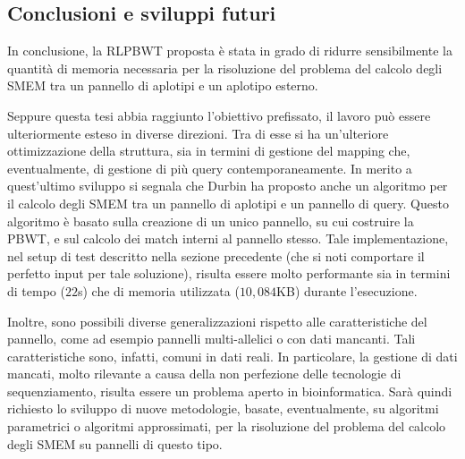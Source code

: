 \documentclass[a4paper,11pt, oneside,italian]{article}
\begin{document}
\subsection*{Conclusioni e sviluppi futuri}
In conclusione, la RLPBWT proposta è stata in grado di ridurre sensibilmente la
quantità di memoria necessaria per la risoluzione del 
problema del calcolo degli SMEM tra un pannello di aplotipi e un aplotipo
esterno.  

Seppure questa tesi abbia raggiunto l'obiettivo prefissato, il lavoro può essere
ulteriormente esteso in diverse direzioni. 
Tra di esse si ha
un'ulteriore ottimizzazione della struttura, sia in termini 
di gestione del mapping che, eventualmente, di gestione di più query
contemporaneamente. In merito a quest'ultimo sviluppo si segnala che Durbin
ha proposto anche un algoritmo per il calcolo degli SMEM tra un pannello di
aplotipi e un pannello di query. Questo algoritmo è basato sulla creazione di un
unico pannello, su cui 
costruire la PBWT, e sul calcolo dei match interni al pannello stesso. Tale
implementazione, nel setup di test 
descritto nella sezione precedente (che si noti comportare il perfetto input per
tale soluzione), risulta essere molto performante sia in
termini di tempo ($22$s) che di memoria utilizzata ($10,084$KB) durante
l'esecuzione.  

Inoltre, sono possibili diverse generalizzazioni rispetto alle caratteristiche
del pannello, come ad esempio pannelli multi-allelici o con dati mancanti. Tali
caratteristiche sono, infatti, comuni in dati reali. In particolare, la gestione
di dati 
mancati, molto rilevante a causa della non perfezione delle tecnologie di
sequenziamento, risulta essere un problema aperto in bioinformatica. Sarà
quindi richiesto lo sviluppo di nuove metodologie, basate, eventualmente,
su algoritmi parametrici o algoritmi approssimati, per la risoluzione del
problema del calcolo degli SMEM su pannelli di questo tipo.
\end{document}
